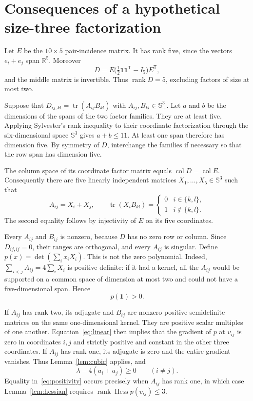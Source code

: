 \documentclass[11pt]{article}
\newcommand{\tr}{\operatorname{tr}}
\newcommand{\rank}{\operatorname{rank}}
\newcommand{\Hess}{\operatorname{Hess}}
\begin{document}
\section{Consequences of a hypothetical size-three factorization}
Let $E$ be the $10\times5$ pair-incidence matrix. It has rank five, since the vectors $e_i+e_j$ span $\mathbb R^5$. Moreover
\[
 D=E\bigl(\tfrac12\mathbf1\mathbf1^{\mathsf T}-I_5\bigr)E^{\mathsf T},
\]
and the middle matrix is invertible. Thus $\rank D=5$, excluding factors of size at most two.

Suppose that $D_{ij,kl}=\tr(A_{ij}B_{kl})$ with $A_{ij},B_{kl}\in\mathbb S^3_+$. Let $a$ and $b$ be the dimensions of the spans of the two factor families. They are at least five. Applying Sylvester's rank inequality to their coordinate factorization through the six-dimensional space $\mathbb S^3$ gives $a+b\leq11$. At least one span therefore has dimension five. By symmetry of $D$, interchange the families if necessary so that the row span has dimension five.

The column space of its coordinate factor matrix equals $\operatorname{col}D=\operatorname{col}E$. Consequently there are five linearly independent matrices $X_1,\ldots,X_5\in\mathbb S^3$ such that
\begin{equation}\label{eq:linear}
 A_{ij}=X_i+X_j,\qquad
 \tr(X_iB_{kl})=\begin{cases}0&i\in\{k,l\},\\1&i\notin\{k,l\}.
 \end{cases}
\end{equation}
The second equality follows by injectivity of $E$ on its five coordinates.

Every $A_{ij}$ and $B_{ij}$ is nonzero, because $D$ has no zero row or column. Since $D_{ij,ij}=0$, their ranges are orthogonal, and every $A_{ij}$ is singular. Define $p(x)=\det(\sum_i x_iX_i)$. This is not the zero polynomial. Indeed, $\sum_{i<j}A_{ij}=4\sum_iX_i$ is positive definite: if it had a kernel, all the $A_{ij}$ would be supported on a common space of dimension at most two and could not have a five-dimensional span. Hence
\begin{equation}\label{eq:p1}
 p(\mathbf1)>0.
\end{equation}

If $A_{ij}$ has rank two, its adjugate and $B_{ij}$ are nonzero positive semidefinite matrices on the same one-dimensional kernel. They are positive scalar multiples of one another. Equation~\eqref{eq:linear} then implies that the gradient of $p$ at $v_{ij}$ is zero in coordinates $i,j$ and strictly positive and constant in the other three coordinates. If $A_{ij}$ has rank one, its adjugate is zero and the entire gradient vanishes. Thus Lemma~\ref{lem:cubic} applies, and
\begin{equation}\label{eq:positivity}
 \lambda-4(a_i+a_j)\geq0\qquad(i\ne j).
\end{equation}
Equality in~\eqref{eq:positivity} occurs precisely when $A_{ij}$ has rank one, in which case Lemma~\ref{lem:hessian} requires $\rank\Hess p(v_{ij})\leq3$.
\end{document}
